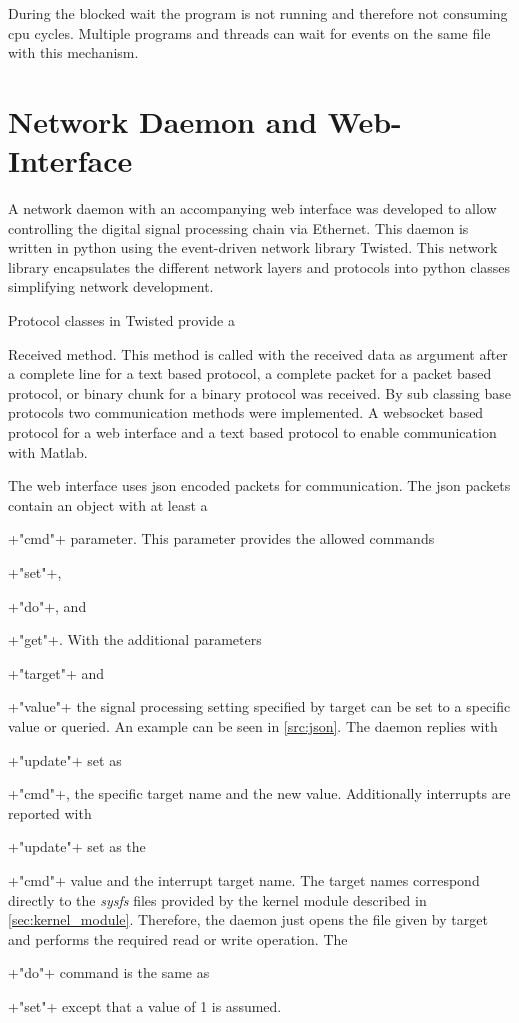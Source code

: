\documentclass[12pt,a4paper,parskip=full,abstract=true,BCOR=12mm,twoside,open=right]{scrreprt}
\newcommand*{\SavedLstInline}{}
\DeclareRobustCommand*{\lstinline}{%
  \ifmmode
    \let\SavedBGroup\bgroup
    \def\bgroup{%
      \let\bgroup\SavedBGroup
      \hbox\bgroup
    }%
  \fi
  \SavedLstInline
}
\def\device#1{\textit{#1}}
\begin{document}
During the blocked wait the program is not running and therefore not
consuming \gls{cpu} cycles. Multiple programs and threads can wait
for events on the same file with this mechanism.


\section{Network Daemon and Web-Interface}
\label{sec:daemon}
\lstset{language=python}

A network daemon with an accompanying web interface was developed to allow
controlling the digital signal processing chain via Ethernet. This daemon
is written in python using the event-driven network library Twisted\cite{twisted}.
This network library encapsulates the different network layers and protocols
into python classes simplifying network development.

Protocol classes in Twisted provide a \lstinline{Received} method. This method
is called with the received data as argument after a complete line for a text based
protocol, a complete packet for a packet based protocol, or binary chunk for a binary
protocol was received. By sub classing base protocols two communication methods were
implemented. A websocket based protocol for a web interface and a text based protocol
to enable communication with Matlab.

The web interface uses \gls{json} encoded packets for communication. The \gls{json}
packets contain an object with at least a \lstinline+"cmd"+ parameter. This parameter
provides the allowed commands \lstinline+"set"+, \lstinline+"do"+, and \lstinline+"get"+.
With the additional parameters \lstinline+"target"+ and \lstinline+"value"+ the signal
processing setting specified by target can be set to a specific value or queried. An example
can be seen in \cref{src:json}. The daemon replies
with \lstinline+"update"+ set as \lstinline+"cmd"+, the specific target name and the
new value. Additionally interrupts are reported with \lstinline+"update"+ set as the
\lstinline+"cmd"+ value and the interrupt target name. The target names correspond
directly to the \device{sysfs} files provided by the kernel module described in
\cref{sec:kernel_module}. Therefore, the daemon just opens the file given by target
and performs the required read or write operation. The \lstinline+"do"+ command is the same
as \lstinline+"set"+ except that a value of 1 is assumed.
\end{document}
